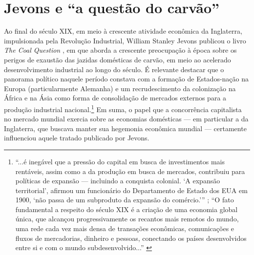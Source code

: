 \section{Jevons e ``a questão do carvão''}
Ao final do século XIX, em meio à crescente atividade econômica da Inglaterra, impulsionada pela Revolução Industrial, William Stanley Jevons publicou o livro \textit{The Coal Question} \citeyear{Jevons1866}, em que aborda a crescente preocupação à época sobre os perigos de exaustão das jazidas domésticas de carvão, em meio ao acelerado desenvolvimento industrial ao longo do século. É relevante destacar que o panorama político naquele período constava com a formação de Estados-nação na Europa (particularmente Alemanha) e um recrudescimento da colonização na África e na Ásia como forma de consolidação de mercados externos para a produção industrial nacional.\footnote{``...é inegável que a pressão do capital em busca de investimentos mais rentáveis, assim como a da produção em busca de mercados, contribuiu para políticas de expansão --- incluindo a conquista colonial. `A expansão territorial', afirmou um funcionário do Departamento de Estado dos EUA em 1900, `não passa de um subproduto da expansão do comércio.''' \parencite[p. 45]{Hobsbawm1987}; ``O fato fundamental a respeito do século XIX é a criação de uma economia global única, que alcançou progressivamente os recantos mais remotos do mundo, uma rede cada vez mais densa de transações econômicas, comunicações e fluxos de mercadorias, dinheiro e pessoas, conectando os países desenvolvidos entre si e com o mundo subdesenvolvido...'' \parencite[p. 62]{Hobsbawm1987}} Em suma, o papel que a concorrência capitalista no mercado mundial exercia sobre as economias domésticas --- em particular a da Inglaterra, que buscava manter sua hegemonia econômica mundial --- certamente influenciou aquele tratado publicado por Jevons.


